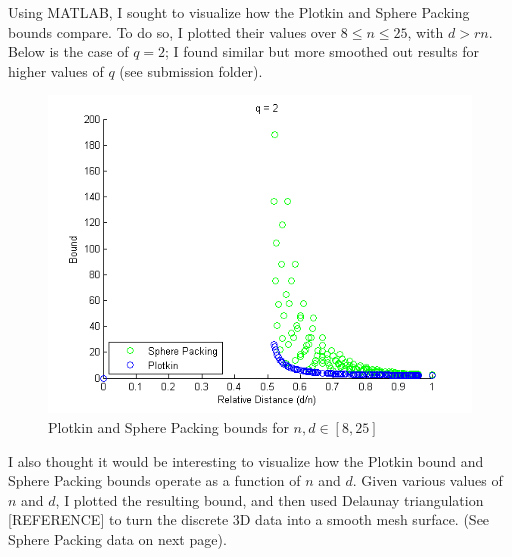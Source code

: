 \documentclass{article}
\theoremstyle{plain}
\theoremstyle{definition}
\begin{document}
Using MATLAB, I sought to visualize how the Plotkin and Sphere Packing bounds compare.  To do so, I plotted their values over $8\le n \le 25$, with $d>rn$.  Below is the case
of $q=2$; I found similar but more smoothed out results for higher values of $q$ (see submission folder).

\begin{figure}[ht]
\includegraphics[width=.8\linewidth]{plotkin_q2.png}
\caption{Plotkin and Sphere Packing bounds for $n,d\in[8,25]$}
\end{figure}
I also thought it would be interesting to visualize how the Plotkin bound and Sphere Packing bounds operate as a function of $n$ and $d$.  Given various values of $n$ and $d$, I plotted the resulting bound, 
and then used Delaunay triangulation [REFERENCE] to turn the discrete 3D data into a smooth mesh surface.  (See Sphere Packing data on next page).  
\end{document}
